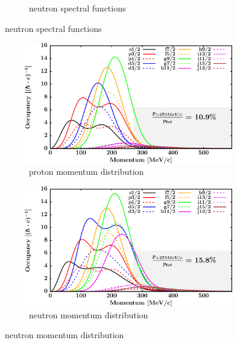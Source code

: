 \begin{figure}[hbtp]
\begin{subfigure}[b]{0.45\textwidth}
        \caption{\snFour\ neutron spectral functions}
        \label{DOMFitData_sn124_neutron_spectralFunctions}
    \end{subfigure}
\end{figure}
\afterpage{\clearpage}
\begin{figure}[hbtp]
    \captionsetup[subfigure]{labelformat=empty}
    \centering
    \begin{subfigure}[b]{0.45\textwidth}
        \centering
        \includegraphics[width=\linewidth]{figures/sn124_protonLJMomentumDistIntegral.png}
        \caption{\snFour\ proton momentum distribution}
        \label{DOMFitData_sn124_proton_momentumDist}
    \end{subfigure}\hspace{6pt}
    \begin{subfigure}[b]{0.45\textwidth}
        \centering
        \includegraphics[width=\linewidth]{figures/sn124_neutronLJMomentumDistIntegral.png}
        \caption{\snFour\ neutron momentum distribution}
        \label{DOMFitData_sn124_neutron_momentumDist}
    \end{subfigure}\vspace{0.3in}

\end{figure}
